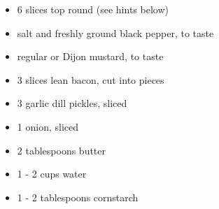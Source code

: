 \begin{itemize}
  \item 6 slices top round (see hints below)
  \item salt and freshly ground black pepper, to taste
  \item regular or Dijon mustard, to taste
  \item 3 slices lean bacon, cut into pieces
  \item 3 garlic dill pickles, sliced
  \item 1 onion, sliced
  \item 2 tablespoons butter
  \item 1 - 2 cups water
  \item 1 - 2 tablespoons cornstarch
\end{itemize}

